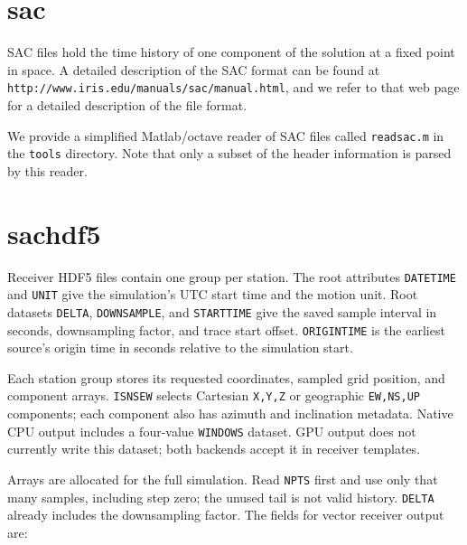 \documentclass[11pt]{report}
\begin{document}
\section{sac}\label{sec:sac-format}

SAC files hold the time history of one component of the solution at a fixed point in space.  A
detailed description of the SAC format can be found at {\tt
http://www.iris.edu/manuals/sac/manual.html}, and we refer to that web page for a detailed
description of the file format.

We provide a simplified Matlab/octave reader of SAC files called {\tt readsac.m} in the {\tt tools}
directory. Note that only a subset of the header information is parsed by this reader.

\section{sachdf5}\label{sec:sachdf5-format}

Receiver HDF5 files contain one group per station. The root attributes
\texttt{DATETIME} and \texttt{UNIT} give the simulation's UTC start time and
the motion unit. Root datasets \texttt{DELTA}, \texttt{DOWNSAMPLE}, and
\texttt{STARTTIME} give the saved sample interval in seconds, downsampling
factor, and trace start offset. \texttt{ORIGINTIME} is the earliest source's
origin time in seconds relative to the simulation start.

Each station group stores its requested coordinates, sampled grid position,
and component arrays. \texttt{ISNSEW} selects Cartesian \texttt{X,Y,Z} or
geographic \texttt{EW,NS,UP} components; each component also has azimuth and
inclination metadata. Native CPU output includes a four-value
\texttt{WINDOWS} dataset. GPU output does not currently write this dataset;
both backends accept it in receiver templates.

Arrays are allocated for the full simulation. Read \texttt{NPTS} first and
use only that many samples, including step zero; the unused tail is not valid
history. \texttt{DELTA} already includes the downsampling factor.
The fields for vector receiver output are:
\end{document}
